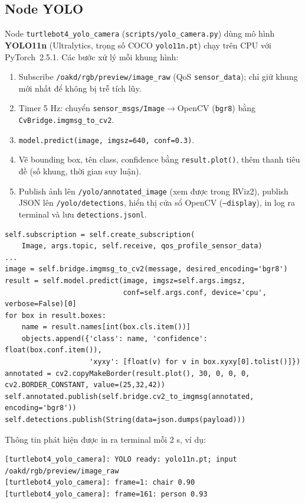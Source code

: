 \documentclass[a4paper,12pt]{article}
\begin{document}
\subsection{Node YOLO}
Node \texttt{turtlebot4\_yolo\_camera} (\texttt{scripts/yolo\_camera.py}) dùng mô hình \textbf{YOLO11n} (Ultralytics, trọng số COCO \texttt{yolo11n.pt}) chạy trên CPU với PyTorch~2.5.1. Các bước xử lý mỗi khung hình:
\begin{enumerate}[nosep]
  \item Subscribe \texttt{/oakd/rgb/preview/image\_raw} (QoS \texttt{sensor\_data}); chỉ giữ khung mới nhất để không bị trễ tích lũy.
  \item Timer 5 Hz: chuyển \texttt{sensor\_msgs/Image}$\to$OpenCV (\texttt{bgr8}) bằng \texttt{CvBridge.imgmsg\_to\_cv2}.
  \item \texttt{model.predict(image, imgsz=640, conf=0.3)}.
  \item Vẽ bounding box, tên class, confidence bằng \texttt{result.plot()}, thêm thanh tiêu đề (số khung, thời gian suy luận).
  \item Publish ảnh lên \texttt{/yolo/annotated\_image} (xem được trong RViz2), publish JSON lên \texttt{/yolo/detections}, hiển thị cửa sổ OpenCV (\texttt{--display}), in log ra terminal và lưu \texttt{detections.jsonl}.
\end{enumerate}
\begin{lstlisting}
self.subscription = self.create_subscription(
    Image, args.topic, self.receive, qos_profile_sensor_data)
...
image = self.bridge.imgmsg_to_cv2(message, desired_encoding='bgr8')
result = self.model.predict(image, imgsz=self.args.imgsz,
                            conf=self.args.conf, device='cpu', verbose=False)[0]
for box in result.boxes:
    name = result.names[int(box.cls.item())]
    objects.append({'class': name, 'confidence': float(box.conf.item()),
                    'xyxy': [float(v) for v in box.xyxy[0].tolist()]})
annotated = cv2.copyMakeBorder(result.plot(), 30, 0, 0, 0, cv2.BORDER_CONSTANT, value=(25,32,42))
self.annotated.publish(self.bridge.cv2_to_imgmsg(annotated, encoding='bgr8'))
self.detections.publish(String(data=json.dumps(payload)))
\end{lstlisting}
Thông tin phát hiện được in ra terminal mỗi 2 s, ví dụ:
\begin{lstlisting}[language={},numbers=none]
[turtlebot4_yolo_camera]: YOLO ready: yolo11n.pt; input /oakd/rgb/preview/image_raw
[turtlebot4_yolo_camera]: frame=1: chair 0.90
[turtlebot4_yolo_camera]: frame=161: person 0.93
\end{lstlisting}
\end{document}
